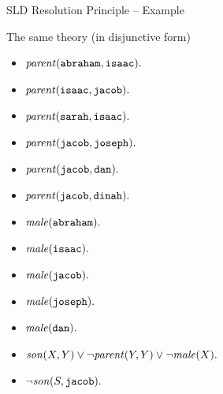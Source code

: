 \documentclass[presentation]{beamer}\mode<presentation>{\usetheme{AMSBolognaFC}}
\begin{document}
\begin{frame}[allowframebreaks]{SLD Resolution Principle -- Example}
    \begin{alertblock}{The same theory (in disjunctive form)}
        \begin{multicols}{2}
            \begin{itemize}
                \item $\text{\textit{parent}}(\mathtt{abraham}, \mathtt{isaac}) \mathtt{.}$
                \item $\text{\textit{parent}}(\mathtt{isaac}, \mathtt{jacob}) \mathtt{.}$
                \item $\text{\textit{parent}}(\mathtt{sarah}, \mathtt{isaac}) \mathtt{.}$
                \item $\text{\textit{parent}}(\mathtt{jacob}, \mathtt{joseph}) \mathtt{.}$
                \item $\text{\textit{parent}}(\mathtt{jacob}, \mathtt{dan}) \mathtt{.}$
                \item $\text{\textit{parent}}(\mathtt{jacob}, \mathtt{dinah}) \mathtt{.}$
                \item $\text{\textit{male}}(\mathtt{abraham}) \mathtt{.}$
                \item $\text{\textit{male}}(\mathtt{isaac}) \mathtt{.}$
                \item $\text{\textit{male}}(\mathtt{jacob}) \mathtt{.}$
                \item $\text{\textit{male}}(\mathtt{joseph}) \mathtt{.}$
                \item $\text{\textit{male}}(\mathtt{dan}) \mathtt{.}$
            \end{itemize}
        \end{multicols}
        \begin{itemize}
            \item $\text{\textit{son}}(X, Y) \vee \neg\text{\textit{parent}}(Y, Y) \vee \neg\text{\textit{male}}(X) \mathtt{.}$
            \item $\neg\text{\textit{son}}(S, \mathtt{jacob}) \mathtt{.}$
        \end{itemize}
    \end{alertblock}


\end{frame}
\end{document}
